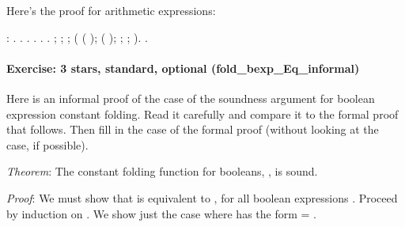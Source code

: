 \documentclass[12pt]{report}
\begin{document}
 Here's the proof for arithmetic expressions: 
\begin{coqdoccode}
\coqdocemptyline
\coqdocnoindent
{}  :\coqdoceol
\coqdocindent{1.00em}
 .\coqdoceol
\coqdocnoindent
{}.\coqdoceol
\coqdocindent{1.00em}
 .  .  .  .\coqdoceol
\coqdocindent{1.00em}
 ; ;\coqdoceol
\coqdocindent{2.00em}
\coqdoceol
\coqdocindent{2.00em}
 ;\coqdoceol
\coqdocindent{2.00em}
\coqdoceol
\coqdocindent{2.00em}
 ( ( );\coqdoceol
\coqdocindent{4.50em}
 ( );\coqdoceol
\coqdocindent{4.50em}
 ;  ; ). .\coqdoceol
\coqdocemptyline
\end{coqdoccode}
\paragraph{Exercise: 3 stars, standard, optional (fold\_bexp\_Eq\_informal)}




    Here is an informal proof of the  case of the soundness
    argument for boolean expression constant folding.  Read it
    carefully and compare it to the formal proof that follows.  Then
    fill in the  case of the formal proof (without looking at the
     case, if possible).


   \textit{Theorem}: The constant folding function for booleans,
   , is sound.


   \textit{Proof}: We must show that  is equivalent to  ,
   for all boolean expressions .  Proceed by induction on .  We
   show just the case where  has the form  = .
\end{document}
